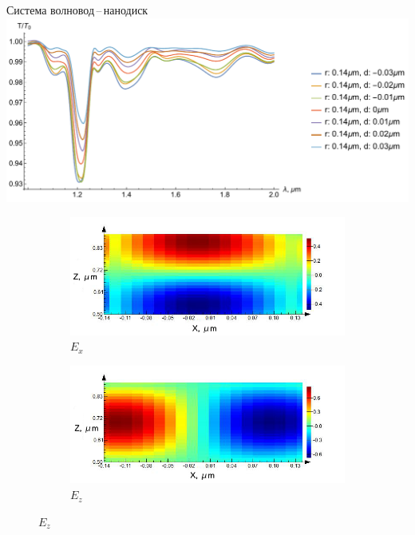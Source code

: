 \begin{frame}{Система волновод\,--\,нанодиск}
	\centering
	\includegraphics[width=\textwidth]{img/r_014_d_var}
	
	\begin{figure}
		\begin{subfigure}[b]{.5\textwidth}
			\includegraphics[width=\textwidth]{img/E_x_014_presentation}
			\caption{$E_x$}
		\end{subfigure}%
		\begin{subfigure}[b]{.5\textwidth}
			\includegraphics[width=\textwidth]{img/E_z_014_presentation}
			\caption{$E_z$}
		\end{subfigure}
	\end{figure}
\end{frame}